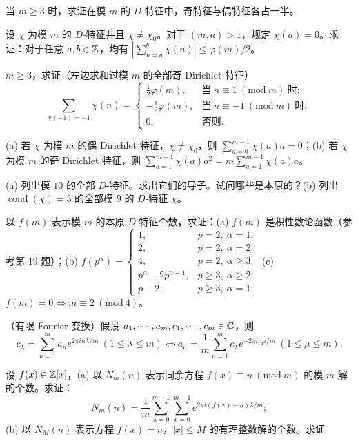 \begin{Exercises}
  \item 当 $m\geqslant 3$ 时，求证在模 $m$ 的 $D$-特征中，奇特征与偶特征各占一半。
  \item 设 $\chi$ 为模 $m$ 的 $D$-特征并且 $\chi\neq\chi_0$。对于 $(m,a)>1$，规定 $\chi(a)=0$。求证：对于任意 $a,b\in\mathbb{Z}$，均有 $\left|\sum_{n=a}^{b}\chi(n)\right|\leqslant\varphi(m)/2$。
  \item $m\geqslant 3$，求证（左边求和过模 $m$ 的全部奇 Dirichlet 特征）
  \[
    \sum_{\chi(-1)=-1}\chi(n)=\begin{cases}
      \frac{1}{2}\varphi(m), & \text{当}\ n\equiv 1\ (\mathrm{mod}\ m)\ \text{时};\\
      -\frac{1}{2}\varphi(m), & \text{当}\ n\equiv -1\ (\mathrm{mod}\ m)\ \text{时};\\
      0, & \text{否则}.
    \end{cases}
  \]
  \item (a) 若 $\chi$ 为模 $m$ 的偶 Dirichlet 特征，$\chi\neq\chi_0$，则 $\sum_{a=0}^{m-1}\chi(a)a=0$；(b) 若 $\chi$ 为模 $m$ 的奇 Dirichlet 特征，则 $\sum_{a=1}^{m-1}\chi(a)a^2=m\sum_{a=1}^{m-1}\chi(a)a$。
  \item (a) 列出模 $10$ 的全部 $D$-特征。求出它们的导子。试问哪些是本原的？(b) 列出 $\operatorname{cond}(\chi)=3$ 的全部模 $9$ 的 $D$-特征 $\chi$。
  \item 以 $f(m)$ 表示模 $m$ 的本原 $D$-特征个数，求证：(a) $f(m)$ 是积性数论函数（参考第 19 题）；(b) $f(p^\alpha)=\begin{cases}1, & p=2,\ \alpha=1;\\ 2, & p=2,\ \alpha=2;\\ 4, & p=2,\ \alpha\geqslant 3;\\ p^\alpha-2p^{\alpha-1}, & p\geqslant 3,\ \alpha\geqslant 2;\\ p-2, & p\geqslant 3,\ \alpha=1;\end{cases}$ (c) $f(m)=0\Leftrightarrow m\equiv 2\ (\mathrm{mod}\ 4)$。
  \item （有限 Fourier 变换）假设 $a_1,\cdots,a_m,c_1,\cdots,c_m\in\mathbb{C}$，则
  \[
    c_\lambda=\sum_{n=1}^{m}a_ne^{2\pi in\lambda/m}\ (1\leqslant\lambda\leqslant m)
    \Leftrightarrow a_\mu=\frac{1}{m}\sum_{n=1}^{m}c_\lambda e^{-2\pi in\mu/m}\ (1\leqslant\mu\leqslant m).
  \]
  \item 设 $f(x)\in\mathbb{Z}[x]$，(a) 以 $N_m(n)$ 表示同余方程 $f(x)\equiv n\ (\mathrm{mod}\ m)$ 的模 $m$ 解的个数。求证：
  \[
    N_m(n)=\frac{1}{m}\sum_{\lambda=0}^{m-1}\sum_{x=0}^{m-1}e^{2\pi i(f(x)-n)\lambda/m};
  \]
  (b) 以 $N_M(n)$ 表示方程 $f(x)=n$，$|x|\leqslant M$ 的有理整数解的个数。求证

\end{Exercises}
